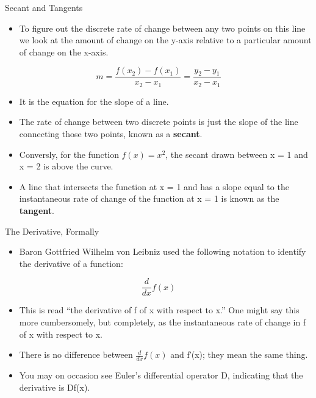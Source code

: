 \documentclass[
  ignorenonframetext,
]{beamer}
\providecommand{\tightlist}{%
  \setlength{\itemsep}{0pt}\setlength{\parskip}{0pt}}
\begin{document}
\begin{frame}{Secant and Tangents}
\protect\hypertarget{secant-and-tangents}{}

\begin{itemize}
\tightlist
\item
  To figure out the discrete rate of change between any two points on
  this line we look at the amount of change on the y-axis relative to a
  particular amount of change on the x-axis.
\end{itemize}

\[m = \frac{f(x_{2}) -f(x_{1})}{x_{2}- x_{1}}=\frac{y_{2}- y_{1}}{x_{2}-x_{1}}\]

\begin{itemize}
\item
  It is the equation for the slope of a line.
\item
  The rate of change between two discrete points is just the slope of
  the line connecting those two points, known as a \textbf{secant}.
\item
  Conversly, for the function \(f(x) = x^{2}\), the secant drawn between
  x = 1 and x = 2 is above the curve.
\item
  A line that intersects the function at x = 1 and has a slope equal to
  the instantaneous rate of change of the function at x = 1 is known as
  the \textbf{tangent}.
\end{itemize}

\end{frame}

\begin{frame}{The Derivative, Formally}
\protect\hypertarget{the-derivative-formally}{}

\begin{itemize}
\tightlist
\item
  Baron Gottfried Wilhelm von Leibniz used the following notation to
  identify the derivative of a function:
\end{itemize}

\[\frac{d}{dx}f(x)\]

\begin{itemize}
\item
  This is read ``the derivative of f of x with respect to x.'' One might
  say this more cumbersomely, but completely, as the instantaneous rate
  of change in f of x with respect to x.
\item
  There is no difference between \(\frac{d}{dx}f(x)\) and f′(x); they
  mean the same thing.
\item
  You may on occasion see Euler's differential operator D, indicating
  that the derivative is Df(x).
\end{itemize}

\end{frame}
\end{document}
